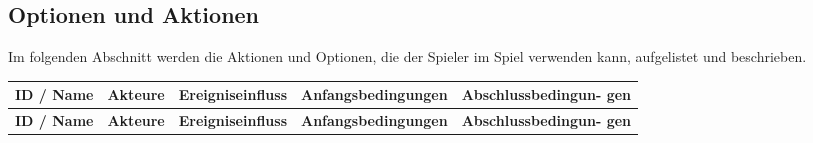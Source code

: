 \subsection{Optionen und Aktionen}\label{subsec:optionen-und-aktionen}

Im folgenden Abschnitt werden die Aktionen und Optionen, die der Spieler im Spiel verwenden kann, aufgelistet und beschrieben.\\



\let\origclearpage\clearpage
\renewcommand{\clearpage}{\relax}


\begin{longtable}{|p{1.6cm}|p{1.9cm}|p{5.5cm}|p{3.2cm}|p{4.2cm}|}
    \hline
    \rowcolor{gray!30}
    \textbf{ID / Name} & \textbf{Akteure} & \textbf{Ereigniseinfluss} & \textbf{Anfangsbedingungen} & \textbf{Abschlussbedingun- gen} \\
    \hline
    \endfirsthead

    \hline
    \rowcolor{gray!30}
    \textbf{ID / Name} & \textbf{Akteure} & \textbf{Ereigniseinfluss} & \textbf{Anfangsbedingungen} & \textbf{Abschlussbedingun- gen} \\
    \hline
    \endhead


\end{longtable}
